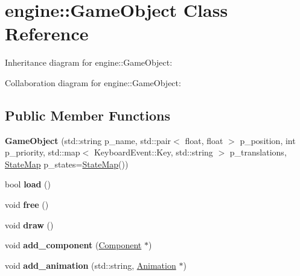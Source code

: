 \hypertarget{classengine_1_1_game_object}{}\section{engine\+:\+:Game\+Object Class Reference}
\label{classengine_1_1_game_object}


Inheritance diagram for engine\+:\+:Game\+Object\+:


Collaboration diagram for engine\+:\+:Game\+Object\+:
\subsection*{Public Member Functions}
\begin{DoxyCompactItemize}
\item 
{\bfseries Game\+Object} (std\+::string p\+\_\+name, std\+::pair$<$ float, float $>$ p\+\_\+position, int p\+\_\+priority, std\+::map$<$ Keyboard\+Event\+::\+Key, std\+::string $>$ p\+\_\+translations, \hyperlink{classengine_1_1_state_map}{State\+Map} p\+\_\+states=\hyperlink{classengine_1_1_state_map}{State\+Map}())\hypertarget{classengine_1_1_game_object_a59a216d31883f3acdc8f53b2f316aaa3}{}\label{classengine_1_1_game_object_a59a216d31883f3acdc8f53b2f316aaa3}

\item 
bool {\bfseries load} ()\hypertarget{classengine_1_1_game_object_ab6289ed26a76a17506ffb26869904844}{}\label{classengine_1_1_game_object_ab6289ed26a76a17506ffb26869904844}

\item 
void {\bfseries free} ()\hypertarget{classengine_1_1_game_object_ab4ab356f4d4499ac1edac37f9932056c}{}\label{classengine_1_1_game_object_ab4ab356f4d4499ac1edac37f9932056c}

\item 
void {\bfseries draw} ()\hypertarget{classengine_1_1_game_object_abb64143e72358beb808db22182517802}{}\label{classengine_1_1_game_object_abb64143e72358beb808db22182517802}

\item 
void {\bfseries add\+\_\+component} (\hyperlink{classengine_1_1_component}{Component} $\ast$)\hypertarget{classengine_1_1_game_object_a22d54d2fd7ef478eda303b975c760b0e}{}\label{classengine_1_1_game_object_a22d54d2fd7ef478eda303b975c760b0e}

\item 
void {\bfseries add\+\_\+animation} (std\+::string, \hyperlink{classengine_1_1_animation}{Animation} $\ast$)\hypertarget{classengine_1_1_game_object_ab2d993b4a7670e2ed3ffb5d3f681d5ec}{}\label{classengine_1_1_game_object_ab2d993b4a7670e2ed3ffb5d3f681d5ec}


\end{DoxyCompactItemize}
